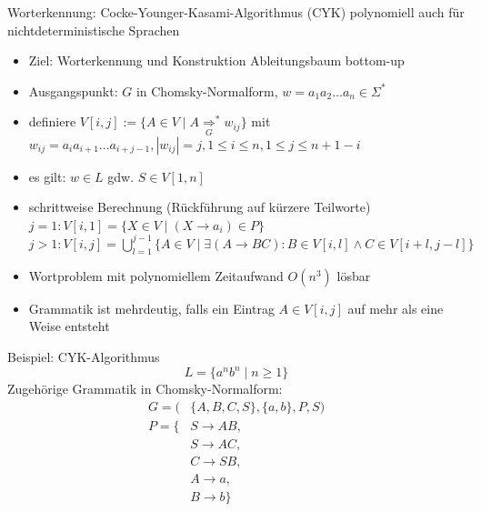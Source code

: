 \begin{frame}{Worterkennung: Cocke-Younger-Kasami-Algorithmus (CYK)}
	polynomiell auch für nichtdeterministische Sprachen
	\begin{itemize}
		\item Ziel: Worterkennung und Konstruktion Ableitungsbaum bottom-up
		\item Ausgangspunkt: $G$ in Chomsky-Normalform, $w=a_1a_2 \ldots a_n \in \Sigma^*$
		\item definiere $V[i,j]:=\{A \in V \mid A \underset{G}{\Rightarrow}^* w_{ij} \}$ mit\\
		$w_{ij}=a_ia_{i+1}\ldots a_{i+j-1}, |w_{ij}|=j, 1\leq i \leq n, 1\leq j \leq n+1-i$
		\item es gilt: $w\in L$ gdw. $S \in V[1,n]$
		\item schrittweise Berechnung (Rückführung auf kürzere Teilworte)\\
		$j=1: V[i,1]=\{X \in V \mid (X\rightarrow a_i) \in P\}$\\
		$j>1: V[i,j]=\bigcup_{l=1}^{j-1}\{A\in V\mid \exists (A\rightarrow BC): B \in V[i,l] \land C \in V[i+l, j-l] \}$
		\item Wortproblem mit polynomiellem Zeitaufwand $O(n^3)$ lösbar
		\item Grammatik ist mehrdeutig, falls ein Eintrag $A \in V[i,j]$ auf mehr als eine Weise entsteht
	\end{itemize}
\end{frame}

\begin{frame}{Beispiel: CYK-Algorithmus}
	$$L=\{a^nb^n\mid n\geq 1\}$$
	Zugehörige Grammatik in Chomsky-Normalform:
	\begin{align*}
		G=(&\{A, B, C, S\}, \{a, b\}, P, S)\\
		P=\{&S \rightarrow AB,\\
		    &S \rightarrow AC,\\
		    &C\rightarrow SB,\\
		    &A\rightarrow a,\\
		    &B\rightarrow b\}
	\end{align*}
	
\end{frame}

